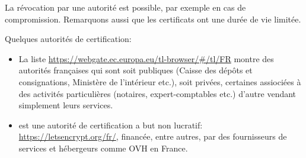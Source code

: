  La révocation par une autorité est possible, par exemple en cas de
  compromission. Remarquons aussi que les certificats ont une
 durée de vie limitée.

 Quelques  autorités de certification:

 \begin{itemize}
 \item La liste \url{https://webgate.ec.europa.eu/tl-browser/#/tl/FR}
   montre des autorités françaises qui sont soit publiques (Caisse des dépôts
   et consignations, Ministère de l'intérieur etc.),  soit privées,
   certaines assiociées à des activités particulières (notaires,
   expert-comptables etc.) d'autre vendant simplement leurs services.
   
 \item {} est une autorité de certification a but non
   lucratif: \url{https://letsencrypt.org/fr/}, financée, entre
   autres, par des fournisseurs de services et hébergeurs comme OVH en
   France.
 \end{itemize}
   
